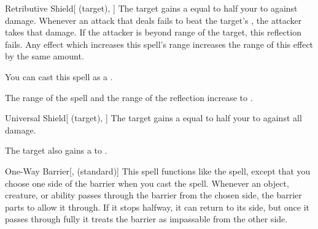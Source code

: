 \lowercase{\hypertarget{spell:Retributive Shield}{}}\label{spell:Retributive Shield}
\begin{attuneability}[Rank 6]{\hypertarget{spell:Retributive Shield}{Retributive Shield}}[ (target), ]
The target gains a  equal to half your  to  against  damage.
Whenever an attack that deals  fails to beat the target's , the attacker takes that damage.
If the attacker is beyond \rngclose range of the target, this reflection fails.
Any effect which increases this spell's range increases the range of this effect by the same amount.

You can cast this spell as a .

\rankline
{} The range of the spell and the range of the reflection increase to \rngmed.
\end{attuneability}
\vspace{0.25em}



\lowercase{\hypertarget{spell:Universal Shield}{}}\label{spell:Universal Shield}
\begin{attuneability}[Rank 6]{\hypertarget{spell:Universal Shield}{Universal Shield}}[ (target), ]
The target gains a  equal to half your  to  against all damage.

\rankline
{} The target also gains a   to .
\end{attuneability}
\vspace{0.25em}



\lowercase{\hypertarget{spell:One-Way Barrier}{}}\label{spell:One-Way Barrier}
\begin{freeability}[Rank 7]{\hypertarget{spell:One-Way Barrier}{One-Way Barrier}}[,  (standard)]
\targetrule
This spell functions like the  spell, except that you choose one side of the barrier when you cast the spell.
Whenever an object, creature, or ability passes through the barrier from the chosen side, the barrier parts to allow it through.
If it stops halfway, it can return to its side, but once it passes through fully it treats the barrier as impassable from the other side.
\end{freeability}
\vspace{0.25em}



